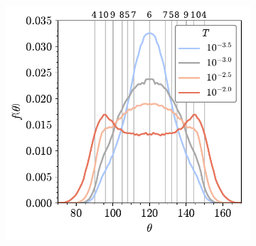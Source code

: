 \begin{figure}[bt]
     \centering
     
     \begin{subfigure}[b]{0.45\textwidth}
         \centering
         \includegraphics[width=\textwidth]{./figures/bilayers/tri_raft_angle.pdf}
         \caption{}
         \label{fig:trang}
     \end{subfigure}
     \hfill
     

\end{figure}
